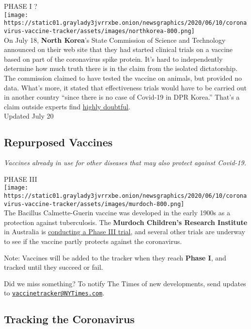 PHASE I ?\\
\texttt{[image: https://static01.graylady3jvrrxbe.onion/newsgraphics/2020/06/10/coronavirus-vaccine-tracker/assets/images/northkorea-800.png]}\\
On July 18, \textbf{North Korea}'s State Commission of Science and
Technology announced on their web site that they had started clinical
trials on a vaccine based on part of the coronavirus spike protein. It's
hard to independently determine how much truth there is in the claim
from the isolated dictatorship. The commission claimed to have tested
the vaccine on animals, but provided no data. What's more, it stated
that effectiveness trials would have to be carried out in another
country ``since there is no case of Covid-19 in DPR Korea.'' That's a
claim outside experts find
\href{https://www.nytimes3xbfgragh.onion/2020/03/31/world/asia/north-korea-coronavirus.html}{highly
doubtful}.\\
Updated July 20

\hypertarget{repurposed-vaccines}{%
\subsection{\texorpdfstring{\textbf{Repurposed
Vaccines}}{Repurposed Vaccines}}\label{repurposed-vaccines}}

\emph{Vaccines already in use for other diseases that may also protect
against Covid-19.}

PHASE III\\
\texttt{[image: https://static01.graylady3jvrrxbe.onion/newsgraphics/2020/06/10/coronavirus-vaccine-tracker/assets/images/murdoch-800.png]}\\
The Bacillus Calmette-Guerin vaccine was developed in the early 1900s as
a protection against tuberculosis. The \textbf{Murdoch Children's
Research Institute} in Australia is
\href{https://www.nytimes3xbfgragh.onion/2020/04/03/health/coronavirus-bcg-vaccine.html}{conducting
a Phase III trial}, and several other trials are underway to see if the
vaccine partly protects against the coronavirus.

Note: Vaccines will be added to the tracker when they reach
\textbf{Phase I}, and tracked until they succeed or fail.

Did we miss something? To notify The Times of new developments, send
updates to
\href{mailto:vaccinetracker@NYTimes.com}{\nolinkurl{vaccinetracker@NYTimes.com}}.

\hypertarget{tracking-the-coronavirus}{%
\subsection{Tracking the Coronavirus}\label{tracking-the-coronavirus}}

